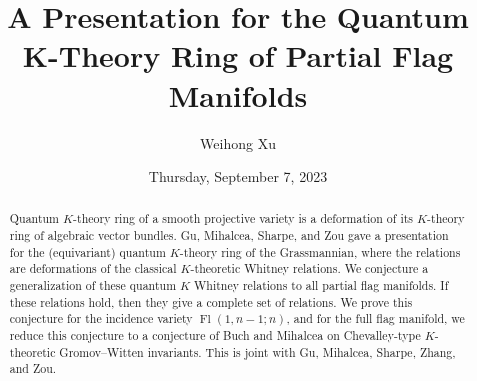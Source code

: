 \documentclass{UAmathtalk}
\author{Weihong Xu}
\title{A Presentation for the Quantum K-Theory Ring of Partial Flag Manifolds}
\date{Thursday, September 7, 2023}
\begin{document}
\maketitle

\begin{abstract}
Quantum $K$-theory ring of a smooth projective variety is a deformation of its $K$-theory ring of algebraic vector bundles. Gu, Mihalcea, Sharpe, and Zou gave a presentation for the (equivariant) quantum $K$-theory ring of the Grassmannian, where the relations are deformations of the classical $K$-theoretic Whitney relations. We conjecture a generalization of these quantum $K$ Whitney relations to all partial flag manifolds. If these relations hold, then they give a complete set of relations. We prove this conjecture for the incidence variety $\operatorname{Fl}(1,n-1;n)$, and for the full flag manifold, we reduce this conjecture to a conjecture of Buch and Mihalcea on Chevalley-type $K$-theoretic Gromov--Witten invariants. This is joint with Gu, Mihalcea, Sharpe, Zhang, and Zou.
\end{abstract}
\end{document}

